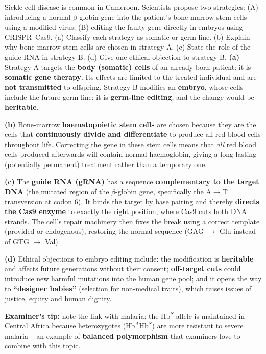 \documentclass[11pt]{article}
\begin{document}
\begin{exoresolu}
Sickle cell disease is common in Cameroon. Scientists propose two strategies: (A) introducing a normal $\beta$-globin gene into the patient's bone-marrow stem cells using a modified virus; (B) editing the faulty gene directly in embryos using CRISPR--Cas9. (a) Classify each strategy as somatic or germ-line. (b) Explain why bone-marrow stem cells are chosen in strategy A. (c) State the role of the guide RNA in strategy B. (d) Give one ethical objection to strategy B.
\tcblower
\textbf{(a)} Strategy A targets the \textbf{body (somatic) cells} of an already-born patient: it is \textbf{somatic gene therapy}. Its effects are limited to the treated individual and are \textbf{not transmitted} to offspring. Strategy B modifies an \textbf{embryo}, whose cells include the future germ line: it is \textbf{germ-line editing}, and the change would be \textbf{heritable}.

\textbf{(b)} Bone-marrow \textbf{haematopoietic stem cells} are chosen because they are the cells that \textbf{continuously divide and differentiate} to produce all red blood cells throughout life. Correcting the gene in these stem cells means that \emph{all} red blood cells produced afterwards will contain normal haemoglobin, giving a long-lasting (potentially permanent) treatment rather than a temporary one.

\textbf{(c)} The \textbf{guide RNA (gRNA)} has a sequence \textbf{complementary to the target DNA} (the mutated region of the $\beta$-globin gene, specifically the A$\rightarrow$T transversion at codon 6). It binds the target by base pairing and thereby \textbf{directs the Cas9 enzyme} to exactly the right position, where Cas9 cuts both DNA strands. The cell's repair machinery then fixes the break using a correct template (provided or endogenous), restoring the normal sequence (GAG $\rightarrow$ Glu instead of GTG $\rightarrow$ Val).

\textbf{(d)} Ethical objections to embryo editing include: the modification is \textbf{heritable} and affects future generations without their consent; \textbf{off-target cuts} could introduce new harmful mutations into the human gene pool; and it opens the way to \textbf{``designer babies''} (selection for non-medical traits), which raises issues of justice, equity and human dignity.

\textbf{Examiner's tip:} note the link with malaria: the $\mathrm{Hb}^S$ allele is maintained in Central Africa because heterozygotes ($\mathrm{Hb}^A\mathrm{Hb}^S$) are more resistant to severe malaria -- an example of \textbf{balanced polymorphism} that examiners love to combine with this topic.
\end{exoresolu}
\end{document}
